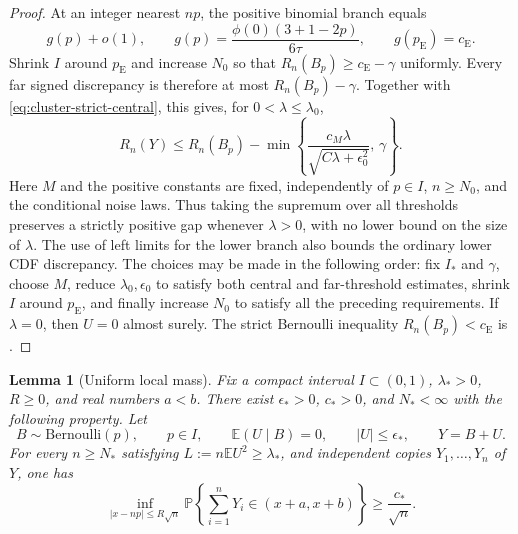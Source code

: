 \documentclass[aop]{imsart}
\theoremstyle{plain}
\newtheorem{lemma}[theorem]{Lemma}
\theoremstyle{definition}
\theoremstyle{definition}
\newcommand{\PP}{\mathbb P}
\newcommand{\EE}{\mathbb E}
\newcommand{\ce}{c_{\mathrm E}}
\newcommand{\pe}{p_{\mathrm E}}
\begin{document}
\begin{proof}
At an integer nearest $np$, the positive binomial branch equals
\[
 g(p)+o(1),\qquad
 g(p)=\frac{\phi(0)(3+1-2p)}{6\tau},\qquad g(\pe)=\ce.
\]
Shrink $I$ around $\pe$ and increase $N_0$ so that
$R_n(B_p)\ge\ce-\gamma$ uniformly. Every far signed discrepancy is therefore at most $R_n(B_p)-\gamma$.
Together with \eqref{eq:cluster-strict-central}, this gives, for
$0<\lambda\le\lambda_0$,
\begin{equation}\label{eq:cluster-uniform-gap}
 R_n(Y)\le R_n(B_p)-
 \min\left\{
       \frac{c_M\lambda}{\sqrt{C\lambda+\epsilon_0^2}},\,
       \gamma
     \right\}.
\end{equation}
Here $M$ and the positive constants are fixed, independently of $p\in I$,
$n\ge N_0$, and the conditional noise laws. Thus taking the supremum
over all thresholds preserves a strictly positive gap whenever
$\lambda>0$, with no lower bound on the size of $\lambda$.
The use of left limits for the lower branch also bounds the ordinary
lower CDF discrepancy. The choices may be made in the following order: fix $I_*$ and
$\gamma$, choose $M$, reduce $\lambda_0,\epsilon_0$ to satisfy both
central and far-threshold estimates, shrink $I$ around $\pe$, and
finally increase $N_0$ to satisfy all the preceding requirements.
If $\lambda=0$, then $U=0$ almost surely. The strict Bernoulli
inequality $R_n(B_p)<\ce$ is
\cite[Theorem~1, p.~1]{Schulz2016}.
\end{proof}

\begin{lemma}[Uniform local mass]\label{lem:two-cluster-local-mass}
Fix a compact interval $I\subset(0,1)$, $\lambda_*>0$, $R\ge0$,
and real numbers $a<b$. There exist $\epsilon_*>0$, $c_*>0$, and
$N_*<\infty$ with the following property. Let
\[
 B\sim\mathrm{Bernoulli}(p),\qquad p\in I,\qquad
 \EE(U\mid B)=0,\qquad |U|\le\epsilon_*,\qquad Y=B+U.
\]
For every $n\ge N_*$ satisfying $L:=n\EE U^2\ge\lambda_*$,
and independent copies $Y_1,\ldots,Y_n$ of $Y$, one has
\[
 \inf_{|x-np|\le R\sqrt n}
 \PP\left\{\sum_{i=1}^nY_i\in(x+a,x+b)\right\}
 \ge\frac{c_*}{\sqrt n}.
\]
\end{lemma}
\end{document}
